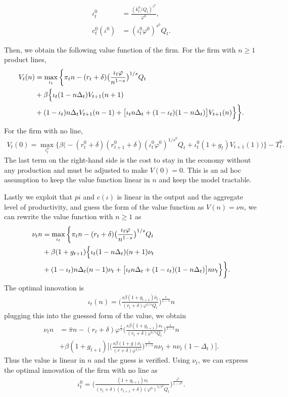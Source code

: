 \documentclass[a4paper,12pt]{article}
\begin{document}
\begin{align}
    \iota_t^0  &= \frac{(k_t^0/Q_t)^{s^0}}{\varphi^0},\\
    c^0_t(\iota^0) &= (\iota_t^0\varphi^0)^{s^0} Q_t.
\end{align}
\par
Then, we obtain the following value function of the firm. For the firm with $n\geq 1$ product lines, 
\begin{align}
    V_t(n) &= \max_{\iota_t}\bigg\{ \pi_t n - (r_t+\delta)\big(\frac{\iota_t\varphi}{n^{1-s}}\big)^{1/s} Q_t \notag\\
    &+ \beta \Big\{\iota_t (1-n\Delta_t)V_{t+1}(n+1) \notag\\
    &+ (1-\iota_t)n\Delta_t V_{t+1}(n-1) + \big[\iota_t n\Delta_t+(1-\iota_t)(1-n\Delta_t)\big]V_{t+1}(n) \Big\}
    \bigg\}.
\end{align}
For the firm with no line, 
\begin{align}
    V_t(0) =\max_{\iota_t^o} \bigg\{\beta\Big(-(r^0_t+\delta)(r^0_{t+1}+\delta) (\iota_t^0 \varphi^0)^{1/s^0}Q_t + \iota_t^0(1+g_t)V_{t+1}(1)\Big)\bigg\} - T_t^0.
\end{align}
The last term on the right-hand side is the cost to stay in the economy without any production and must be adjusted to make $V(0) = 0$. This is an ad hoc assumption to keep the value function linear in $n$ and keep the model tractable.\par
Lastly we exploit that $pi$ and $c(\iota)$ is linear in the output and the aggregate level of productivity, and guess the form of the value function as $V(n) = \nu n$, we can rewrite the value function with $n\geq 1$ as
\begin{align}
    \nu_t n &= \max_{\iota_t}\bigg\{ \pi_t n - (r_t+\delta)\big(\frac{\iota_t\varphi}{n^{1-s}}\big)^{1/s} Q_t \notag\\
    &+ \beta (1+g_{t+1}) \Big\{\iota_t (1-n\Delta_t)(n+1)\nu_t \notag\\
    &+ (1-\iota_t)n\Delta_t (n-1) \nu_t + \big[\iota_t n\Delta_t+(1-\iota_t)(1-n\Delta_t)\big]n\nu_t \Big\}
    \bigg\}.
\end{align}
The optimal innovation is 
\begin{align}
    \iota_t(n) = \Big(\frac{s\beta (1+g_{t+1})\bar\nu_t}{(r_t+\delta)\varphi^{1/s}Q_t}\Big)^\frac{s}{1-s}n
\end{align}
plugging this into the guessed form of the value, we obtain
\begin{align}
    \nu_t n &= \bar{\pi}n -(r_t+\delta) \varphi^\frac{1}{s}\Big(\frac{s\beta (1+g_{t+1})\nu_t}{(r_t+\delta)\varphi^{1/s}Q_t}\Big)^\frac{1}{1-s}n \\
    &+\beta (1+g_{t+1}) \bigg[\Big(\frac{s\beta (1+g)\nu_t}{(r+\delta)\varphi^{1/s}}\Big)^\frac{s}{1-s}n \nu_t + n\nu_t(1-\Delta_t)\bigg].
\end{align}
Thus the value is linear in $n$ and the guess is verified. Using $\nu_t$, we can express the optimal innovation of the firm with no line as
\begin{align}
    \iota_t^0 = \Big(\frac{(1+g_{t+1})\nu_t}{(r_t+\delta)(r_{t+1}+\delta)(\varphi^0)^{1/s^0}Q_t}\Big)^\frac{s^0}{1-s^0}.
\end{align}
\end{document}
